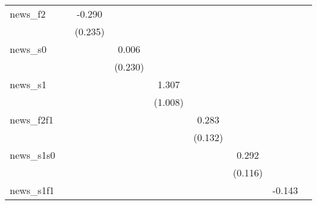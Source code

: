 {\begin{tabular}{l*{8}{c}}
\addlinespace
news\_f2     &                     &      -0.290         &                     &                     &                     &                     &                     &                     \\
            &                     &     (0.235)         &                     &                     &                     &                     &                     &                     \\
\addlinespace
news\_s0     &                     &                     &       0.006         &                     &                     &                     &                     &                     \\
            &                     &                     &     (0.230)         &                     &                     &                     &                     &                     \\
\addlinespace
news\_s1     &                     &                     &                     &       1.307         &                     &                     &                     &                     \\
            &                     &                     &                     &     (1.008)         &                     &                     &                     &                     \\
\addlinespace
news\_f2f1   &                     &                     &                     &                     &       0.283\sym{**} &                     &                     &                     \\
            &                     &                     &                     &                     &     (0.132)         &                     &                     &                     \\
\addlinespace
news\_s1s0   &                     &                     &                     &                     &                     &       0.292\sym{**} &                     &                     \\
            &                     &                     &                     &                     &                     &     (0.116)         &                     &                     \\
\addlinespace
news\_s1f1   &                     &                     &                     &                     &                     &                     &      -0.143         &                     \\

\end{tabular}}
